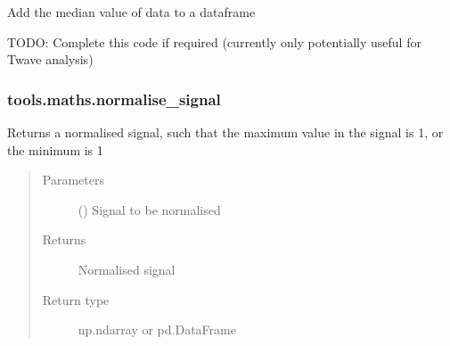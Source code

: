 \documentclass[letterpaper,10pt,english]{sphinxmanual}
\begin{document}
\begin{fulllineitems}
\label{\detokenize{_autosummary/tools.maths.get_median:tools.maths.get_median}}
\sphinxAtStartPar
Add the median value of data to a dataframe

\sphinxAtStartPar
TODO: Complete this code if required (currently only potentially useful for T\sphinxhyphen{}wave analysis)

\end{fulllineitems}



\subsubsection{tools.maths.normalise\_signal}
\label{\detokenize{_autosummary/tools.maths.normalise_signal:tools-maths-normalise-signal}}\label{\detokenize{_autosummary/tools.maths.normalise_signal::doc}}

\begin{fulllineitems}
\label{\detokenize{_autosummary/tools.maths.normalise_signal:tools.maths.normalise_signal}}
\sphinxAtStartPar
Returns a normalised signal, such that the maximum value in the signal is 1, or the minimum is \sphinxhyphen{}1
\begin{quote}\begin{description}
\item[{Parameters}] \leavevmode
\sphinxAtStartPar
{} () \textendash{} Signal to be normalised

\item[{Returns}] \leavevmode
\sphinxAtStartPar
{} \textendash{} Normalised signal

\item[{Return type}] \leavevmode
\sphinxAtStartPar
np.ndarray or pd.DataFrame

\end{description}\end{quote}

\end{fulllineitems}
\end{document}
